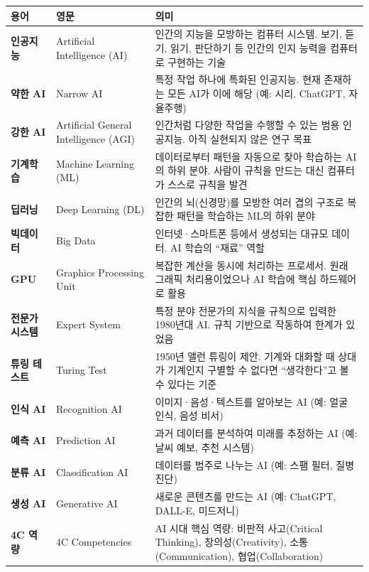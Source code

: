 \documentclass[11pt,a4paper]{article}
\renewcommand{\arraystretch}{1.4}
\begin{document}
\begin{center}
\renewcommand{\arraystretch}{1.5}
\begin{tabular}{|p{3cm}|p{3.5cm}|p{6.5cm}|}
\hline
\rowcolor{tableheader}
\textbf{용어} & \textbf{영문} & \textbf{의미} \\
\hline
\textbf{인공지능} & Artificial Intelligence (AI) & 인간의 지능을 모방하는 컴퓨터 시스템. 보기, 듣기, 읽기, 판단하기 등 인간의 인지 능력을 컴퓨터로 구현하는 기술 \\
\hline
\textbf{약한 AI} & Narrow AI & 특정 작업 하나에 특화된 인공지능. 현재 존재하는 모든 AI가 이에 해당 (예: 시리, ChatGPT, 자율주행) \\
\hline
\textbf{강한 AI} & Artificial General Intelligence (AGI) & 인간처럼 다양한 작업을 수행할 수 있는 범용 인공지능. 아직 실현되지 않은 연구 목표 \\
\hline
\textbf{기계학습} & Machine Learning (ML) & 데이터로부터 패턴을 자동으로 찾아 학습하는 AI의 하위 분야. 사람이 규칙을 만드는 대신 컴퓨터가 스스로 규칙을 발견 \\
\hline
\textbf{딥러닝} & Deep Learning (DL) & 인간의 뇌(신경망)를 모방한 여러 겹의 구조로 복잡한 패턴을 학습하는 ML의 하위 분야 \\
\hline
\textbf{빅데이터} & Big Data & 인터넷·스마트폰 등에서 생성되는 대규모 데이터. AI 학습의 ``재료'' 역할 \\
\hline
\textbf{GPU} & Graphics Processing Unit & 복잡한 계산을 동시에 처리하는 프로세서. 원래 그래픽 처리용이었으나 AI 학습에 핵심 하드웨어로 활용 \\
\hline
\textbf{전문가 시스템} & Expert System & 특정 분야 전문가의 지식을 규칙으로 입력한 1980년대 AI. 규칙 기반으로 작동하여 한계가 있었음 \\
\hline
\textbf{튜링 테스트} & Turing Test & 1950년 앨런 튜링이 제안. 기계와 대화할 때 상대가 기계인지 구별할 수 없다면 ``생각한다''고 볼 수 있다는 기준 \\
\hline
\textbf{인식 AI} & Recognition AI & 이미지·음성·텍스트를 알아보는 AI (예: 얼굴 인식, 음성 비서) \\
\hline
\textbf{예측 AI} & Prediction AI & 과거 데이터를 분석하여 미래를 추정하는 AI (예: 날씨 예보, 추천 시스템) \\
\hline
\textbf{분류 AI} & Classification AI & 데이터를 범주로 나누는 AI (예: 스팸 필터, 질병 진단) \\
\hline
\textbf{생성 AI} & Generative AI & 새로운 콘텐츠를 만드는 AI (예: ChatGPT, DALL-E, 미드저니) \\
\hline
\textbf{4C 역량} & 4C Competencies & AI 시대 핵심 역량: 비판적 사고(Critical Thinking), 창의성(Creativity), 소통(Communication), 협업(Collaboration) \\
\hline
\end{tabular}
\end{center}
\end{document}
